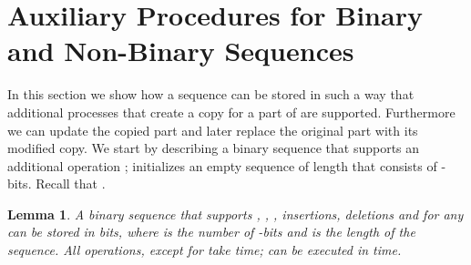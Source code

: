 \documentclass[11pt]{article}\usepackage{fullpage}
\newtheorem{lemma}{Lemma}
\begin{document}
\section{Auxiliary Procedures for Binary and Non-Binary Sequences}
\label{sec:seqaddition}
In this section we show how a sequence  can be stored  in such a way that additional processes that create a copy for a part 
of  are supported. Furthermore we can update the copied part and later replace the original part with its modified copy. 
We start by describing a binary sequence that supports an additional operation ;  initializes an empty sequence of length  that consists of  -bits.  Recall that .
\begin{lemma}
\label{lemma:ints}
  A binary sequence  that supports , , , insertions, deletions and  for any   can be stored in  bits, where  is the number of -bits and  is the length of the sequence. All operations, except for  take  time;  can be executed in  time.
\end{lemma}
\end{document}
